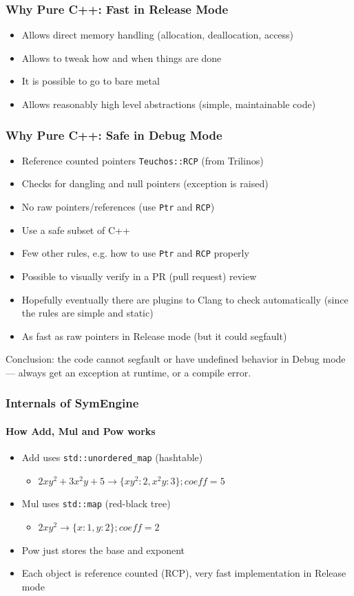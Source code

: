 \documentclass{beamer}
\begin{document}
\begin{frame}
\frametitle{Why Pure C++: Fast in Release Mode}
\begin{itemize}
    \item Allows direct memory handling (allocation, deallocation, access)
    \item Allows to tweak how and when things are done
    \item It is possible to go to bare metal
    \item Allows reasonably high level abstractions (simple, maintainable
        code)
\end{itemize}
\end{frame}

\begin{frame}
\frametitle{Why Pure C++: Safe in Debug Mode}
\begin{itemize}
    \item Reference counted pointers \texttt{Teuchos::RCP} (from Trilinos)
    \item Checks for dangling and null pointers (exception is raised)
    \item No raw pointers/references (use \texttt{Ptr} and \texttt{RCP})
    \item Use a safe subset of C++
    \item Few other rules, e.g. how to use \texttt{Ptr} and \texttt{RCP}
          properly
    \item Possible to visually verify in a PR (pull request) review
    \item Hopefully eventually there are plugins to Clang to check
        automatically (since the rules are simple and static)
    \item As fast as raw pointers in Release mode (but it could segfault)
\end{itemize}
    Conclusion: the code cannot segfault or have undefined behavior in Debug
    mode --- always get an exception at runtime, or a compile error.
\end{frame}


\begin{frame}
\frametitle{Internals of SymEngine}
\framesubtitle{How Add, Mul and Pow works}
\begin{itemize}
    \item Add uses \texttt{std::unordered\_map} (hashtable)
        \begin{itemize}
            \item $2xy^2+3x^2y + 5\to \{xy^2: 2, x^2y: 3\}; coeff=5 $
        \end{itemize}
    \item Mul uses \texttt{std::map} (red-black tree)
        \begin{itemize}
            \item $2 xy^2 \to \{x: 1, y:2\}; coeff=2$
        \end{itemize}
    \item Pow just stores the base and exponent
    \item Each object is reference counted (RCP), very fast implementation in
        Release mode
\end{itemize}
\end{frame}
\end{document}
